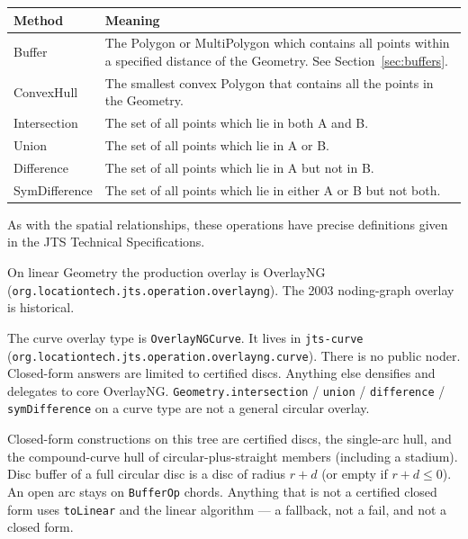 \documentclass[11pt]{article}
\begin{document}
\begin{center}
\begin{tabular}{>{\raggedright\arraybackslash}p{3.2cm}p{10.0cm}}
  \toprule
  \textbf{Method} & \textbf{Meaning} \\
  \midrule
  Buffer         & The Polygon or MultiPolygon which contains all
                   points within a specified distance of the Geometry.
                   See Section~\ref{sec:buffers}. \\
  ConvexHull     & The smallest convex Polygon that contains all the
                   points in the Geometry. \\
  Intersection   & The set of all points which lie in both A and B. \\
  Union          & The set of all points which lie in A or B. \\
  Difference     & The set of all points which lie in A but not in B. \\
  SymDifference  & The set of all points which lie in either A or B
                   but not both. \\
  \bottomrule
\end{tabular}
\end{center}

As with the spatial relationships, these operations have precise
definitions given in the JTS Technical Specifications.

On linear Geometry the production overlay is OverlayNG
(\texttt{org.locationtech.jts.operation.overlayng}). The 2003
noding-graph overlay is historical.

\begin{amendment}
The curve overlay type is \texttt{OverlayNGCurve}. It lives in
\texttt{jts-curve}
(\texttt{org.locationtech.jts.operation.overlayng.curve}). There is
no public noder. Closed-form answers are limited to certified discs.
Anything else densifies and delegates to core OverlayNG.
\texttt{Geometry.intersection} / \texttt{union} / \texttt{difference}
/ \texttt{symDifference} on a curve type are not a general circular
overlay.

Closed-form constructions on this tree are certified discs, the
single-arc hull, and the compound-curve hull of circular-plus-straight
members (including a stadium). Disc buffer of a full circular disc is
a disc of radius $r+d$ (or empty if $r+d \le 0$). An open arc stays
on \texttt{BufferOp} chords. Anything that is not a certified closed
form uses \texttt{toLinear} and the linear algorithm --- a fallback,
not a fail, and not a closed form.
\end{amendment}
\end{document}
